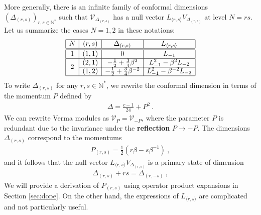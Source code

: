\documentclass[12pt, a4paper]{article}
\theoremstyle{break}
\begin{document}
More generally, there is an infinite family of conformal dimensions $(\Delta_{(r, s)})_{r,s\in\mathbb{N}^*}$ such that $\mathcal{V}_{\Delta_{(r, s)}}$ has a null vector $L_{\langle r,s\rangle} V_{\Delta_{(r, s)}}$ at level $N=rs$. Let us summarize the cases $N=1,2$ in these notations:
\begin{align}
\begin{array}{|c|c|c|c|}
\hline 
N & (r, s) & \Delta_{(r, s)} &  L_{\langle r,s\rangle} 
\\
\hline\hline
1 & (1, 1) & 0 &  L_{-1}
\\
\hline
\multirow{2}{*}{2} & 
(2, 1) & -\frac12 + \frac34 \beta^{2}  & L_{-1}^2 -\beta^{2} L_{-2}
\\
\cline{2-4}
& (1, 2) & -\frac12 + \frac34 \beta^{-2} & L_{-1}^2 -\beta^{-2} L_{-2} 
\\
\hline
\end{array}
\label{ars}
\end{align}
To write $\Delta_{(r, s)}$ for any $r,s\in\mathbb{N}^*$, we rewrite the conformal dimension in terms of the momentum $P$ defined by 
\begin{align}
 \boxed{\Delta = \frac{c-1}{24} + P^2}\ .
 \label{dp}
\end{align}
We can rewrite Verma modules as $\mathcal{V}_P=\mathcal{V}_{-P}$, where the parameter $P$ is redundant due to the invariance under the \textbf{reflection} $P\to -P$. The dimensions $\Delta_{(r, s)}$ correspond to the momentums 
\begin{align}
 \boxed{P_{(r, s)} = \frac12\left(r\beta -s\beta^{-1}\right)}\ ,
 \label{prs}
\end{align}
and it follows that the null vector $L_{\langle r,s\rangle} V_{\Delta_{(r, s)}}$ is a primary state of dimension
\begin{align}
 \Delta_{(r, s)} + rs = \Delta_{(r, -s)}\ , 
 \label{drms}
\end{align}
We will provide a derivation of $P_{(r, s)}$ using operator product expansions in Section \ref{sec:dope}. On the other hand, the expressions of $L_{\langle r,s\rangle} $ are complicated and not particularly useful. 
\end{document}
